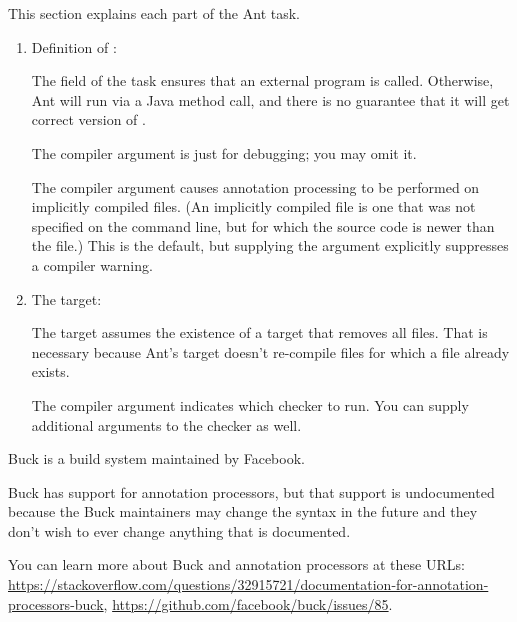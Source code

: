 
This section explains each part of the Ant task.

\begin{enumerate}
\item Definition of :

The  field of the  task
ensures that an external  program is called.  Otherwise, Ant will run
 via a Java method call, and there is no guarantee that it will get
correct version of .

The  compiler argument is just for debugging; you may omit
it.

The  compiler argument causes annotation processing
to be performed on implicitly compiled files.  (An implicitly compiled file
is one that was not specified on the command line, but for which the source
code is newer than the  file.)  This is the default, but
supplying the argument explicitly suppresses a compiler warning.


\item The  target:

The target assumes the existence of a  target that removes all
 files.  That is necessary because Ant's  target
doesn't re-compile  files for which a  file
already exists.

The  compiler argument indicates which checker to
run.  You can supply additional arguments to the checker as well.

\end{enumerate}



Buck is a build system maintained by Facebook.

Buck has support for annotation processors, but that support is
undocumented because the Buck maintainers may change the syntax in the
future and they don't wish to ever change anything that is documented.

You can learn more about Buck and annotation processors at these URLs:
{\codesize\url{https://stackoverflow.com/questions/32915721/documentation-for-annotation-processors-buck}},
{\codesize\url{https://github.com/facebook/buck/issues/85}}.

